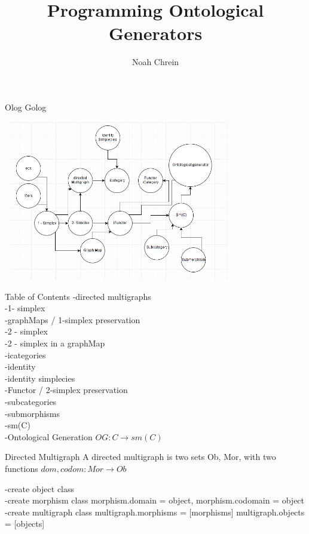 \documentclass[11pt]{beamer}
\title{Programming Ontological Generators}
\author{Noah Chrein}
\begin{document}
\maketitle

\begin{frame}{Olog Golog}
\begin{center}
    
\includegraphics[width=10cm, height=7cm]{"olog golog"}
\end{center}

\end{frame}

\begin{frame}{Table of Contents}
-directed multigraphs\\
-1- simplex\\
-graphMaps / 1-simplex preservation\\
-2 - simplex\\
-2 - simplex in a graphMap\\
-icategories\\
-identity\\
-identity simplecies\\
-Functor / 2-simplex preservation\\
-subcategories\\
-submorphisms\\
-sm(C)\\
-Ontological Generation $OG:C \to sm(C)$\\
\end{frame}

\begin{frame}

\begin{block}{Directed Multigraph}
A directed multigraph is two sets Ob, Mor, with two functions $dom,codom:Mor \to Ob$
\end{block}
-create object class\\ \pause
-create morphism class morphism.domain = object, morphism.codomain = object\\ \pause
-create multigraph class multigraph.morphisms = [morphisms] multigraph.objects = [objects]

\end{frame}
\end{document}

